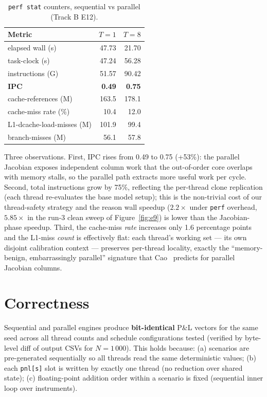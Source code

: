 \documentclass[11pt,twocolumn]{article}
\begin{document}
\begin{table}[h]
\centering\small
\caption{\texttt{perf stat} counters, sequential vs
parallel (Track B E12).}
\label{tab:e12}
\begin{tabular}{lrr}
\toprule
Metric & $T = 1$ & $T = 8$ \\
\midrule
elapsed wall (s)        &  47.73 &  21.70 \\
task-clock (s)          &  47.24 &  56.28 \\
instructions (G)        &  51.57 &  90.42 \\
\textbf{IPC}            &  \textbf{0.49} & \textbf{0.75} \\
cache-references (M)    & 163.5 & 178.1 \\
cache-miss rate (\%)    &  10.4 &  12.0 \\
L1-dcache-load-misses (M)& 101.9 &  99.4 \\
branch-misses (M)       &  56.1 &  57.8 \\
\bottomrule
\end{tabular}
\end{table}

Three observations.  First, IPC rises from 0.49 to 0.75 (+53\%):
the parallel Jacobian exposes independent column work that the
out-of-order core overlaps with memory stalls, so the parallel
path extracts more useful work per cycle.  Second, total
instructions grow by 75\%, reflecting the per-thread clone
replication (each thread re-evaluates the base model setup);
this is the non-trivial cost of our thread-safety strategy and
the reason wall speedup ($2.2\times$ under \texttt{perf} overhead,
$5.85\times$ in the run-3 clean sweep of Figure~\ref{fig:e9}) is
lower than the Jacobian-phase speedup.  Third, the cache-miss \emph{rate}
increases only 1.6 percentage points and the L1-miss \emph{count}
is effectively flat: each thread's working set --- its own disjoint
calibration context --- preserves per-thread locality, exactly the
``memory-benign, embarrassingly parallel'' signature that
Cao~\cite{cao2009} predicts for parallel Jacobian columns.

\section{Correctness}

Sequential and parallel engines produce \textbf{bit-identical}
P\&L vectors for the same seed across all thread counts and
schedule configurations tested (verified by byte-level diff of
output CSVs for $N = 1\,000$).
This holds because: (a) scenarios are pre-generated sequentially
so all threads read the same deterministic values; (b) each
\texttt{pnl[s]} slot is written by exactly one thread (no
reduction over shared state); (c) floating-point addition order
within a scenario is fixed (sequential inner loop over instruments).
\end{document}
